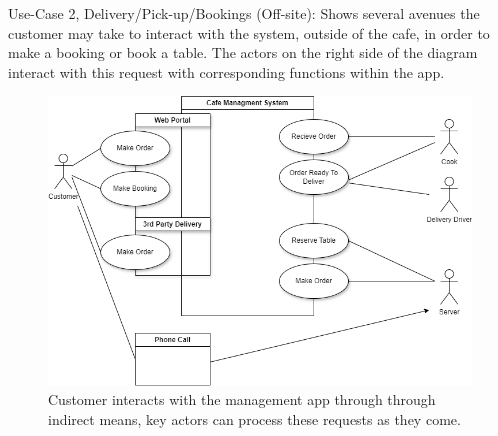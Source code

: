 \documentclass{article}
\begin{document}
Use-Case 2, Delivery/Pick-up/Bookings (Off-site):
Shows several avenues the customer may take to interact with the system, outside of the cafe, in order to make a booking or book a table. The actors on the right side of the diagram interact with this request with corresponding functions within the app.
\\
\begin{figure}[h!]
    \centering
    \includegraphics[width=1\linewidth]{UseCase_Customer.drawio.png}
    \caption{Customer interacts with the management app through through indirect means, key actors can process these requests as they come. }
    \label{fig:enter-label}
\end{figure}
\end{document}
